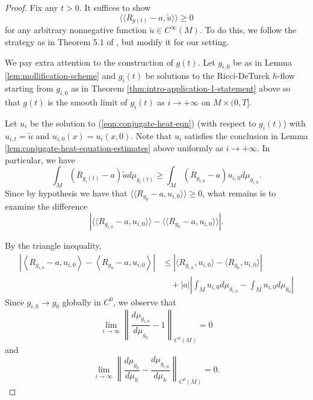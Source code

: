 \documentclass[12pt]{amsart}
\theoremstyle{plain}
\theoremstyle{plain}
\theoremstyle{definition}
\theoremstyle{remark}
\numberwithin{equation}{subsection}
\begin{document}
\begin{proof}
Fix any $t>0$. It suffices to show
    \begin{equation*}
        \langle    \langle  R_{g(t)}-a, \tilde u \rangle \rangle \geq 0
    \end{equation*}
    for any arbitrary nonnegative function $\tilde{u}\in C^\infty(M)$. To do this, we follow the strategy as in Theorem 5.1 of \cite{jiang_weak_2021}, but modify it for our setting. 
    
We pay extra attention to the construction of $g(t)$.  Let $g_{i,0}$ be as in Lemma \ref{lem:mollification-scheme} and $g_i(t)$ be solutions to the Ricci-DeTurck $h$-flow starting from $g_{i,0}$ as in Theorem \ref{thm:intro-application-1-statement} above so that $g(t)$ is the smooth limit of $g_i(t)$ as $i\to+\infty$ on $M\times (0,T]$.

Let $u_i$ be the solution to (\ref{eqn:conjugate-heat-eqn}) (with respect to $g_i(t)$) with $u_{i,t} = \tilde{u}$ and $u_{i,0}(x) = u_i(x,0)$. Note that $u_i$ satisfies the conclusion in Lemma \ref{lem:conjugate-heat-equation-estimates} above uniformly as $i\to+\infty$. In particular, we have
    \begin{equation}\label{eqn:scalar-monotonicity}
        \int_M (R_{g_i(t)}-a)\tilde{u}d\mu_{g_i(t)} \geq \int_M (R_{g_{i,0}}-a)u_{i,0}d\mu_{g_{i,0}}.
    \end{equation}
    Since by hypothesis we have that $\langle\langle R_{g_0} - a,u_{i,0}\rangle\rangle \geq 0$, what remains is to examine the difference
    \begin{equation*}
        \left|\langle \langle R_{g_{i,0}}-a, u_{i,0}\rangle \rangle - \langle\langle R_{g_0} - a, u_{i,0}\rangle\rangle \right|.
    \end{equation*}

    By the triangle inequality,
    \begin{align*}
        \left|\left\langle R_{g_{i,0}}-a, u_{i,0}\right\rangle - \left\langle R_{g_0} - a, u_{i,0}\right\rangle \right| &\leq \left|\langle R_{g_{i,0}},u_{i,0}\rangle - \langle R_{g_0}, u_{i,0}\rangle\right| \nonumber \\
        &\quad + |a|\left|\int_M u_{i,0} d\mu_{g_{i,0}} - \int_M u_{i,0} d\mu_{g_0}\right|
    \end{align*}
    Since $g_{i,0} \to g_0$ globally in $C^0$, we observe that 
    \begin{equation*}
        \lim\limits_{i\to\infty}\left\lVert \frac{d\mu_{g_{i,0}}}{d\mu_{g_0}} - 1\right\rVert_{C^0(M)} = 0
    \end{equation*}
and
    \begin{equation*}
        \lim\limits_{i\to\infty}\left\lVert \frac{d\mu_{g_0}}{d\mu_h} - \frac{d\mu_{g_{i,0}}}{d\mu_h}\right\rVert_{C^0(M)} = 0.
    \end{equation*}


\end{proof}
\end{document}
